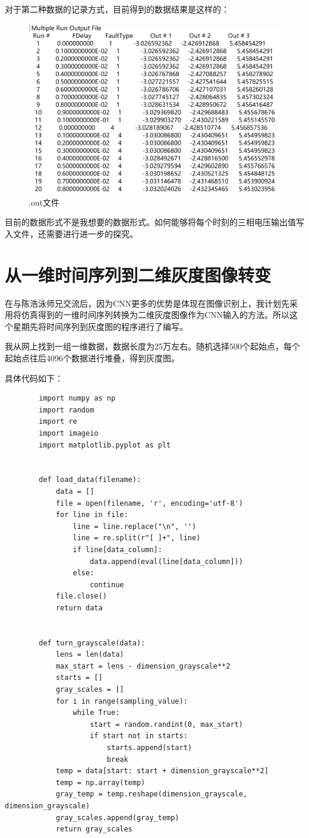 \documentclass{article}
\begin{document}
{	对于第二种数据的记录方式，目前得到的数据结果是这样的：
	
	\begin{figure}[htpb]
		\centering 
		\includegraphics[width=12cm]{figure/7.png}
		\caption{.out文件}
	\end{figure}
	
	目前的数据形式不是我想要的数据形式。如何能够将每个时刻的三相电压输出值写入文件，还需要进行进一步的探究。
	
	\section{从一维时间序列到二维灰度图像转变}
	
	在与陈浩泳师兄交流后，因为CNN更多的优势是体现在图像识别上，我计划先采用将仿真得到的一维时间序列转换为二维灰度图像作为CNN输入的方法。所以这个星期先将时间序列到灰度图的程序进行了编写。
	
	我从网上找到一组一维数据，数据长度为25万左右。随机选择500个起始点，每个起始点往后4096个数据进行堆叠，得到灰度图。
	
	具体代码如下：
	
	\begin{lstlisting}
		import numpy as np
		import random
		import re
		import imageio
		import matplotlib.pyplot as plt
		
		
		def load_data(filename):
			data = []
			file = open(filename, 'r', encoding='utf-8')
			for line in file:
				line = line.replace("\n", '')
				line = re.split(r"[ ]+", line)
				if line[data_column]:
					data.append(eval(line[data_column]))
				else:
					continue
			file.close()
			return data
		
		
		def turn_grayscale(data):
			lens = len(data)
			max_start = lens - dimension_grayscale**2
			starts = []
			gray_scales = []
			for i in range(sampling_value):
				while True:
					start = random.randint(0, max_start)
					if start not in starts:
						starts.append(start)
						break
			temp = data[start: start + dimension_grayscale**2]
			temp = np.array(temp)
			gray_temp = temp.reshape(dimension_grayscale, dimension_grayscale)
			gray_scales.append(gray_temp)
			return gray_scales
		

\end{lstlisting}}
\end{document}

